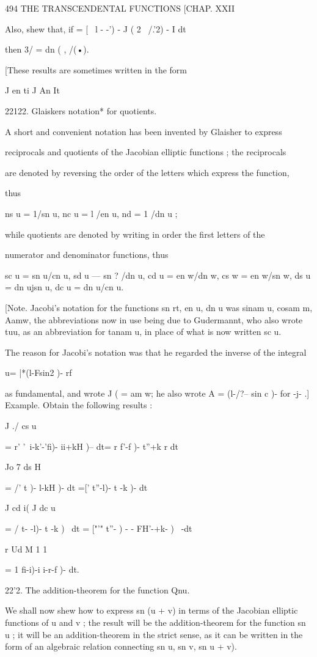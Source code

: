 494 THE TRANSCENDENTAL FUNCTIONS [CHAP. XXII

Also, shew that, if = [ \ l - -') - J ( 2 \ /.'2) - I dt

then 3/ = dn ( , /(•).

[These results are sometimes written in the form

J en ti J An It

22122. Glaiskers notation* for quotients.

A short and convenient notation has been invented by Glaisher to
express

reciprocals and quotients of the Jacobian elliptic functions ; the
reciprocals

are denoted by reversing the order of the letters which express the
function,

thus

ns u = 1/sn u, nc u = l /en u, nd = 1 /dn u ;

while quotients are denoted by writing in order the first letters of
the

numerator and denominator functions, thus

sc u = sn u/cn u, sd u — sn ? /dn u, cd u = en w/dn w, cs w = en w/sn
w, ds u = dn ujsn u, dc u = dn u/cn u.

[Note. Jacobi's notation for the functions sn rt, en u, dn u was sinam
u, cosam m, Aamw, the abbreviations now in use being due to
Gudermannt, who also wrote tuu, as an abbreviation for tanam u, in
place of what is now written sc u.

The reason for Jacobi's notation was that he regarded the inverse of
the integral

u= |*(l-Fsin2 )- rf

as fundamental, and wrote J ( = am w; he also wrote A = (l-/?-- sin c
)- for -j- .] Example. Obtain the following results :

J ./ cs u

= r' '\ i-k'-'fi)- ii+kH )-- dt= r f'-f )- t''+k r dt

Jo 7 ds H

= /' t )- l-kH )- dt =[' t''-l)- t -k )- dt

J cd i( J dc u

= / t- -l)- t -k )~ dt = ["'" t''- ) - - FH'-+k- )~ -dt

r Ud M 1 1

= 1 fi-i)-i i-r-f )- dt.

22'2. The addition-theorem for the function Qnu.

We shall now shew how to express sn (u + v) in terms of the Jacobian
elliptic functions of u and v ; the result will be the
addition-theorem for the function sn u ; it will be an
addition-theorem in the strict sense, as it can be written in the form
of an algebraic relation connecting sn u, sn v, sn u + v).

